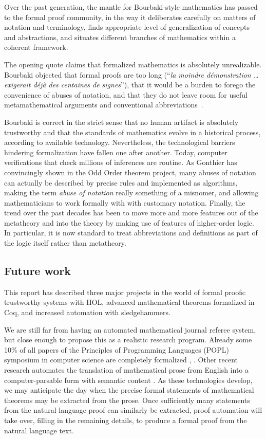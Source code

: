\documentclass[brochure,english,12pt]{bourbaki}
\theoremstyle{plain}
\begin{document}
Over the past generation, the mantle for Bourbaki-style mathematics has  passed to the formal proof community, in the way it
 deliberates carefully on matters of notation and terminology, finds
appropriate level of generalization of concepts and abstractions, and
situates different branches of mathematics within a coherent framework.

The opening quote claims that formalized mathematics is absolutely unrealizable.
Bourbaki objected that formal proofs are too long (``{\it la moindre d\'emonstration \ldots
exigerait d\'ej\`a des centaines de signes}''), that it would be a burden to forego 
the convenience of abuses of notation, and that they do not leave room for useful metamathematical
arguments and conventional abbreviations~\cite{bourbaki1966theorie}.

Bourbaki is correct in the strict sense that no human artifact is absolutely trustworthy and that
the standards of mathematics evolve in a historical process, according to available technology.
Nevertheless,  the technological barriers hindering formalization have fallen one
after another.  Today, computer verifications that
check millions of inferences are routine.
As Gonthier has convincingly shown in the Odd Order theorem project, 
many abuses of notation can actually be described by precise rules and implemented as algorithms,
making the term {\it abuse of notation} really something of a misnomer, and
allowing mathematicians to work formally with with customary notation.
Finally, the 
trend over the past decades has been to move more and more features out of the metatheory and into the theory by making
use of features of higher-order logic.  In particular, it is now
standard to treat abbreviations and definitions as part of the logic itself rather than metatheory.

\subsection{Future work}

This report has described three major projects in the world of formal proofs:
 trustworthy systems with HOL,  advanced mathematical theorems formalized
in Coq, and  increased automation with sledgehammers.   

We are still far from having an automated mathematical journal referee system, but close enough
to propose this as a realistic research program.  Already some 10\% of all papers of the
Principles of Programming Languages (POPL) 
symposium in computer science are completely formalized \cite{SewPOPL2014}, \cite{aydemir2005mechanized}.
Other recent research automates the translation of mathematical prose from English
into a computer-parsable form with semantic content \cite{ganesalingam2013language}.
As these technologies develop, we may anticipate the day when the precise formal statements of mathematical
theorems may be extracted from the prose.  Once sufficiently many statements from the natural language proof 
can similarly be extracted, proof automation will take over, filling in the remaining details, to produce
a formal proof from the natural language text.
\end{document}
